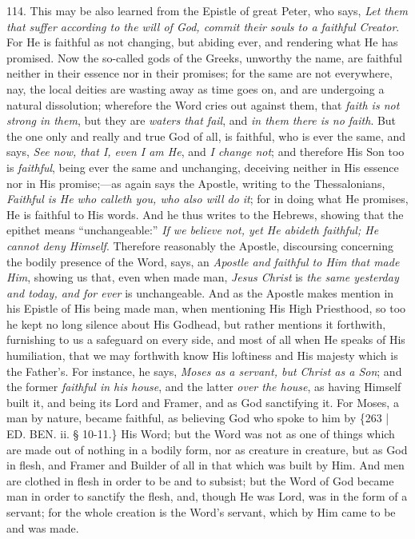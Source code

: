 114. This may be also learned
from the Epistle of great Peter, who says, \emph{Let them that suffer
according to the will of God, commit their souls to a faithful Creator}.
For He is faithful as not changing, but abiding ever, and
rendering what He has promised. Now the so-called gods of the Greeks,
unworthy the name, are faithful neither in their essence nor in their
promises; for the same are not everywhere, nay, the local deities are
wasting away as time goes on, and are undergoing a natural
dissolution; wherefore the Word cries out against them, that \emph{faith
is not strong in them}, but they are \emph{waters that fail}, and \emph{in
them there is no faith}. But the one only and really and true God
of all, is faithful, who is ever the same, and says, \emph{See now, that
I, even I am He}, and \emph{I change not}; and therefore His Son
too is \emph{faithful}, being ever the same and unchanging, deceiving
neither in His essence nor in His promise;—as again says the
Apostle, writing to the Thessalonians, \emph{Faithful is He who calleth
you, who also will do it}; for in doing what He promises, He is
faithful to His words. And he thus writes to the Hebrews, showing that
the epithet means ``unchangeable:'' \emph{If we believe not, yet He abideth
faithful; He cannot deny Himself}. Therefore reasonably the
Apostle, discoursing concerning the bodily presence of the Word, says,
an \emph{Apostle and faithful to Him that made Him}, showing us that,
even when made man, \emph{Jesus Christ} is \emph{the same yesterday and
today, and for ever} is unchangeable. And as the Apostle makes
mention in his Epistle of His being made man, when mentioning His High
Priesthood, so too he kept no long silence about His Godhead, but
rather mentions it forthwith, furnishing to us a safeguard on every
side, and most of all when He speaks of His humiliation, that we may
forthwith know His loftiness and His majesty which is the Father's.
For instance, he says, \emph{Moses as a servant, but Christ as a Son};
and the former \emph{faithful in his house}, and the latter \emph{over
the house}, as having Himself built it, and being its Lord and
Framer, and as God sanctifying it. For Moses, a man by nature, became
faithful, as believing God who spoke to him by \{263 | ED.
BEN.
ii. § 10-11.\} His Word; but the Word was not as one of things which
are made out of nothing in a bodily form, nor as creature in creature,
but as God in flesh, and Framer and Builder of all in that which was
built by Him. And men are clothed in flesh in order to be and to
subsist; but the Word of God became man in order to sanctify the
flesh, and, though He was Lord, was in the form of a servant; for the
whole creation is the Word's servant, which by Him came to be and was
made.

